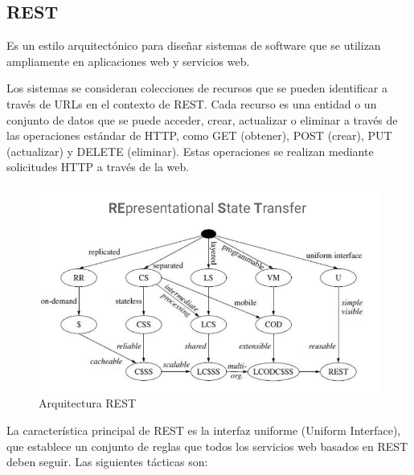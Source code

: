 \documentclass{article}
\begin{document}
		\subsection{REST}
		Es un estilo arquitectónico para diseñar sistemas de software que se utilizan ampliamente en aplicaciones web y servicios web.
		
		Los sistemas se consideran colecciones de recursos que se pueden identificar a través de URLs en el contexto de REST. Cada recurso es una entidad o un conjunto de datos que se puede acceder, crear, actualizar o eliminar a través de las operaciones estándar de HTTP, como GET (obtener), POST (crear), PUT (actualizar) y DELETE (eliminar). Estas operaciones se realizan mediante solicitudes HTTP a través de la web.
		\begin{figure}[h]
			\centering
			\includegraphics[width=1\textwidth]{arquitectura_rest.png}
			\caption{Arquitectura REST}
		\end{figure}
		
		La característica principal de REST es la interfaz uniforme (Uniform Interface), que establece un conjunto de reglas que todos los servicios web basados en REST deben seguir. Las siguientes tácticas son:
\end{document}
